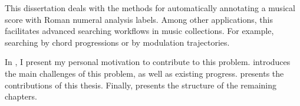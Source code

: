 

This dissertation deals with the methods for automatically
annotating a musical score with Roman numeral analysis
labels. Among other applications, this facilitates advanced
searching workflows in music collections. For example,
searching by chord progressions or by modulation
trajectories.

In , I present my personal motivation to
contribute to this problem.  introduces
the main challenges of this problem, as well as existing
progress.  presents the
contributions of this thesis. Finally,
 presents the structure of the
remaining chapters.
